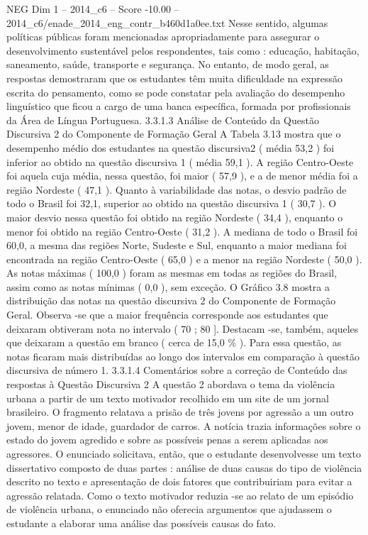 \begin{textsample}{NEG Dim 1 – 2014\_c6 – Score -10.00 – 2014\_c6/enade\_2014\_eng\_contr\_b460d1a0ee.txt}
Nesse sentido, algumas políticas públicas foram mencionadas apropriadamente para assegurar o desenvolvimento sustentável pelos respondentes, tais como : educação, habitação, saneamento, saúde, transporte e segurança.
No entanto, de modo geral, as respostas demostraram que os estudantes têm muita dificuldade na expressão escrita do pensamento, como se pode constatar pela avaliação do desempenho linguístico que ficou a cargo de uma banca específica, formada por profissionais da Área de Língua Portuguesa. 3.3.1.3 Análise de Conteúdo da Questão Discursiva 2 do Componente de Formação Geral A Tabela 3.13 mostra que o desempenho médio dos estudantes na questão discursiva2 ( média 53,2 ) foi inferior ao obtido na questão discursiva 1 ( média 59,1 ).
A região Centro-Oeste foi aquela cuja média, nessa questão, foi maior ( 57,9 ), e a de menor média foi a região Nordeste ( 47,1 ).
Quanto à variabilidade das notas, o desvio padrão de todo o Brasil foi 32,1, superior ao obtido na questão discursiva 1 ( 30,7 ).
O maior desvio nessa questão foi obtido na região Nordeste ( 34,4 ), enquanto o menor foi obtido na região Centro-Oeste ( 31,2 ).
A mediana de todo o Brasil foi 60,0, a mesma das regiões Norte, Sudeste e Sul, enquanto a maior mediana foi encontrada na região Centro-Oeste ( 65,0 ) e a menor na região Nordeste ( 50,0 ).
As notas máximas ( 100,0 ) foram as mesmas em todas as regiões do Brasil, assim como as notas mínimas ( 0,0 ), sem exceção.
O Gráfico 3.8 mostra a distribuição das notas na questão discursiva 2 do Componente de Formação Geral.
Observa -se que a maior frequência corresponde aos estudantes que deixaram obtiveram nota no intervalo ( 70 ; 80 ].
Destacam -se, também, aqueles que deixaram a questão em branco ( cerca de 15,0 \% ).
Para essa questão, as notas ficaram mais distribuídas ao longo dos intervalos em comparação à questão discursiva de número 1. 3.3.1.4 Comentários sobre a correção de Conteúdo das respostas à Questão Discursiva 2 A questão 2 abordava o tema da violência urbana a partir de um texto motivador recolhido em um site de um jornal brasileiro.
O fragmento relatava a prisão de três jovens por agressão a um outro jovem, menor de idade, guardador de carros.
A notícia trazia informações sobre o estado do jovem agredido e sobre as possíveis penas a serem aplicadas aos agressores.
O enunciado solicitava, então, que o estudante desenvolvesse um texto dissertativo composto de duas partes : análise de duas causas do tipo de violência descrito no texto e apresentação de dois fatores que contribuiriam para evitar a agressão relatada.
Como o texto motivador reduzia -se ao relato de um episódio de violência urbana, o enunciado não oferecia argumentos que ajudassem o estudante a elaborar uma análise das possíveis causas do fato.

\end{textsample}
